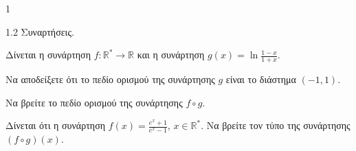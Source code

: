 \begin{ylh}{1}
    \item 1.2 Συναρτήσεις.
\end{ylh}
Δίνεται η συνάρτηση $f : \mathbb{R}^* \to \mathbb{R}$ και η συνάρτηση $g(x) = \ln \frac{1-x}{1+x}$.
\begin{alist}
\item Να αποδείξετε ότι το πεδίο ορισμού της συνάρτησης $g$ είναι το διάστημα $(-1, 1)$. 
\item Να βρείτε το πεδίο ορισμού της συνάρτησης $f \circ g$. 
\item Δίνεται ότι η συνάρτηση $f(x)=\frac{e^x+1}{e^x-1}$, $x \in \mathbb{R}^*$. Να βρείτε τον τύπο της συνάρτησης $(f \circ g)(x)$. 
\end{alist}